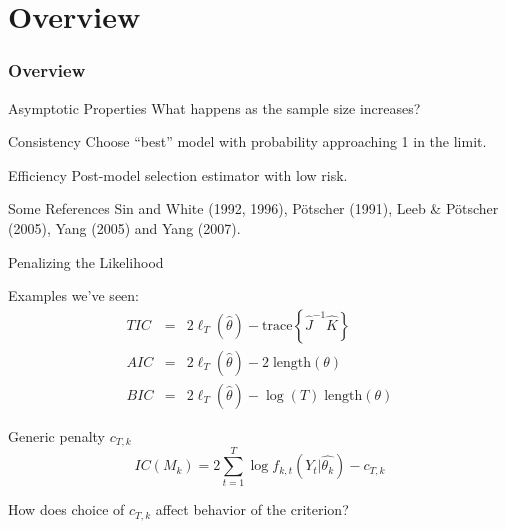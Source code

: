 \section{Overview}
\begin{frame}
  \frametitle{Overview}

  \begin{block}{Asymptotic Properties}
   What happens as the sample size increases?
  \end{block}

  \begin{block}{Consistency}
    Choose ``best'' model with probability approaching 1 in the limit.
  \end{block}

  \begin{block}{Efficiency}
    Post-model selection estimator with low risk.
  \end{block}

  \begin{block}{Some References}
      Sin and White (1992, 1996), P\"{o}tscher (1991), Leeb \& P\"{o}tscher (2005), Yang (2005) and Yang (2007).
  \end{block}
  
\end{frame}
\begin{frame}{Penalizing the Likelihood}
  
  \begin{block}{Examples we've seen:}
	\begin{eqnarray*}
		 TIC &=& 2\ell_T(\widehat{\theta}) -\mbox{trace}\left\{\widehat{J}^{-1} \widehat{K} \right\}\\
		AIC &=& 2\ell_T(\widehat{\theta}) - 2\; \mbox{length}(\theta)\\
		BIC &=& 2\ell_T(\widehat{\theta}) - \log(T)\; \mbox{length}(\theta)
	\end{eqnarray*}

  \pause

  \begin{block}{Generic penalty $c_{T,k}$}
    \[IC(M_k) = 2 \sum_{t=1}^T \log f_{k,t}(Y_t| \widehat{\theta_k}) - c_{T,k}\]
  \end{block}

  \pause

  \begin{alertblock}{How does choice of $c_{T,k}$ affect behavior of the criterion?}
  \end{alertblock}


  \end{block}
\end{frame}
